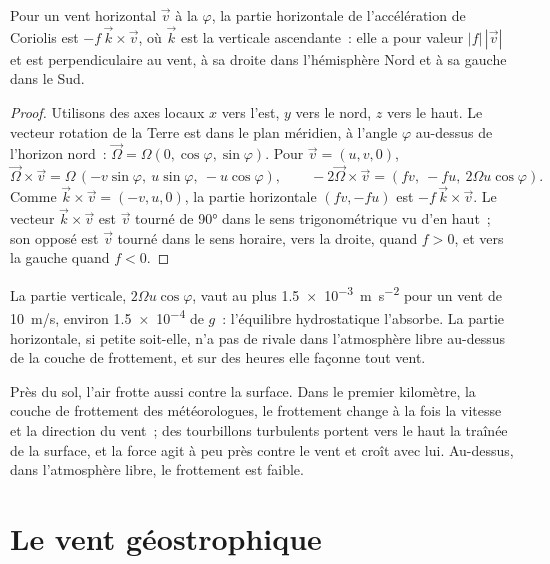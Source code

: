 \begin{proposition}\label{prop:b1:atmospheric-circulation:coriolis}
Pour un vent horizontal $\vec v$ à la  $\varphi$, la partie horizontale de
l'accélération de Coriolis est $-f\,\vec k\times\vec v$, où $\vec k$ est la verticale
ascendante~: elle a pour valeur $|f|\,|\vec v|$ et est perpendiculaire au vent,
à sa droite dans l'hémisphère Nord et à sa gauche dans le Sud.
\end{proposition}

\begin{proof}
Utilisons des axes locaux $x$ vers l'est, $y$ vers le nord, $z$ vers le haut. Le vecteur rotation de la Terre est dans le
plan méridien, à l'angle $\varphi$ au-dessus de l'horizon nord~: $\vec\Omega =
\Omega(0, \cos\varphi, \sin\varphi)$. Pour $\vec v = (u, v, 0)$,
\[
  \vec\Omega\times\vec v = \Omega\,(-v\sin\varphi,\ u\sin\varphi,\ -u\cos\varphi),
  \qquad -2\vec\Omega\times\vec v = (f v,\ -f u,\ 2\Omega u\cos\varphi).
\]
Comme $\vec k\times\vec v = (-v, u, 0)$, la partie horizontale $(fv, -fu)$ est
$-f\,\vec k\times\vec v$. Le vecteur $\vec k\times\vec v$ est $\vec v$ tourné de
\ang{90} dans le sens trigonométrique vu d'en haut~; son opposé est $\vec v$ tourné dans le sens horaire,
vers la droite, quand $f > 0$, et vers la gauche quand $f < 0$.
\end{proof}

La partie verticale, $2\Omega u\cos\varphi$, vaut au plus \qty{1.5e-3}{m.s^{-2}} pour un
vent de \qty{10}{m/s}, environ \num{1.5e-4} de $g$~: l'équilibre hydrostatique
l'absorbe. La partie horizontale, si petite soit-elle, n'a pas de rivale dans l'atmosphère
libre au-dessus de la couche de frottement, et sur des heures elle façonne tout vent.

Près du sol, l'air frotte aussi contre la surface. Dans le premier kilomètre, la
couche de frottement des météorologues, le frottement change à la fois la vitesse et la
direction du vent~; des tourbillons turbulents portent vers le haut la traînée de la surface, et la
force agit à peu près contre le vent et croît avec lui. Au-dessus, dans l'atmosphère libre,
le frottement est faible.

\section{Le vent géostrophique}\label{sec:b1:atmospheric-circulation:geostrophic}

